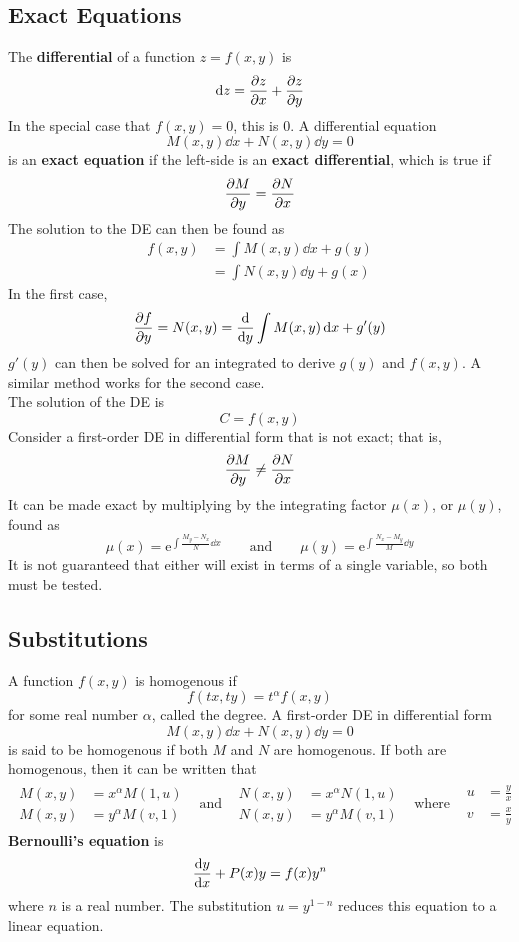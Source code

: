 \documentclass[12pt, A4]{article}
\newcommand{\en}{\text{e}}
\begin{document}
		\subsection{Exact Equations}
			The \textbf{differential} of a function \(z = f(x, y)\) is
				\[\dd{z} = \pdv{z}{x} + \pdv{z}{y}\]
				In the special case that \(f(x, y) = 0\), this is 0. 
				A differential equation
				\[M(x, y)\dd{x} + N(x, y)\dd{y} = 0\]
				is an \textbf{exact equation} if the left-side is an \textbf{exact differential}, which is true if
				\[\pdv{M}{y} = \pdv{N}{x}\]
				The solution to the DE can then be found as
				\begin{align*}
					f(x, y) &= \int M(x, y) \dd{x} + g(y) \\
						&= \int N(x, y) \dd{y} + g(x)
				\end{align*}
				In the first case,
				\[
					\pdv{f}{y} = N(x, y)
						= \dv{y}\int M(x, y) \dd{x} + g'(y)
				\]
				\(g'(y)\) can then be solved for an integrated to derive \(g(y)\) and \(f(x, y)\). A similar method works for the second case. \\
				The solution of the DE is
				\[C = f(x, y)\]
				Consider a first-order DE in differential form that is not exact; that is,
				\[\pdv{M}{y} \ne \pdv{N}{x}\]
				It can be made exact by multiplying by the integrating factor \(\mu(x)\), or \(\mu(y)\), found as
				\[
					\mu(x) = \en^{\int \frac{M_y - N_x}{N}\dd{x}} \qquad \text{and} \qquad
					\mu(y) = \en^{\int \frac{N_x - M_y}{M}\dd{y}}
				\]
				It is not guaranteed that either will exist in terms of a single variable, so both must be tested.
		\subsection{Substitutions}
			A function \(f(x, y)\) is homogenous if
				\[f(tx, ty) = t^\alpha f(x, y)\]
				for some real number \(\alpha\), called the degree. A first-order DE in differential form
				\[M(x, y)\dd{x} + N(x, y)\dd{y} = 0\]
				is said to be homogenous if both \(M\) and \(N\) are homogenous. If both are homogenous, then it can be written that
				\[\begin{array}{ccccc}
					\begin{aligned}
						M(x, y) &= x^\alpha M(1, u) \\
						M(x, y) &= y^\alpha M(v, 1)
					\end{aligned} & \text{and} &
					\begin{aligned}
						N(x, y) &= x^\alpha N(1, u) \\
						N(x, y) &= y^\alpha M(v, 1)
					\end{aligned} & \text{where} &
					\begin{aligned}
						u &= \frac{y}{x} \\
						v &= \frac{x}{y}	
					\end{aligned}
				\end{array}\]
			\textbf{Bernoulli's equation} is 
				\[\dv{y}{x} + P(x)y = f(x)y^n\]
				where \(n\) is a real number. The substitution \(u = y^{1 - n}\) reduces this equation to a linear equation.
	\setcounter{section}{3}
\end{document}
